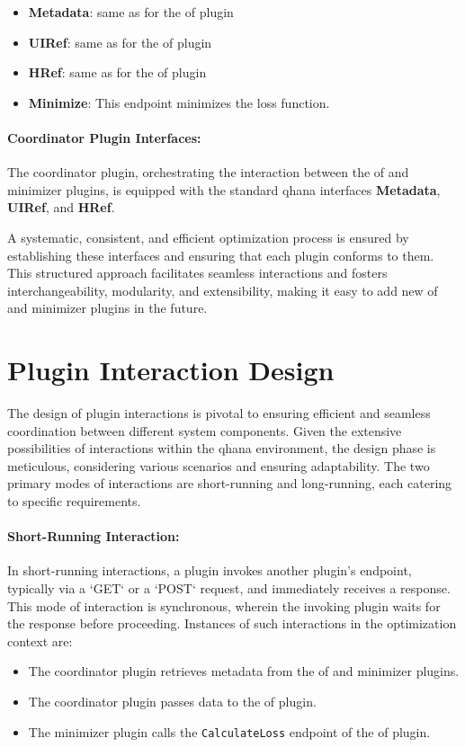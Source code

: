 \documentclass[
  a4paper,  %
  twoside,  %
  bibliography=totoc,
  headsepline,
  cleardoublepage=empty,
  parskip=half,
  draft=false
]{scrbook}
\begin{document}
\begin{itemize}
  \item \textbf{Metadata}: same as for the \gls{of} plugin
  \item \textbf{UIRef}: same as for the \gls{of} plugin
  \item \textbf{HRef}: same as for the \gls{of} plugin
  \item \textbf{Minimize}: This endpoint minimizes the loss function.
\end{itemize}

\paragraph{Coordinator Plugin Interfaces:}

The coordinator plugin, orchestrating the interaction between the \gls{of} and minimizer plugins, is equipped with the standard \gls{qhana} interfaces \textbf{Metadata}, \textbf{UIRef}, and \textbf{HRef}.

A systematic, consistent, and efficient optimization process is ensured by establishing these interfaces and ensuring that each plugin conforms to them.
This structured approach facilitates seamless interactions and fosters interchangeability, modularity, and extensibility, making it easy to add new \gls{of} and minimizer plugins in the future.

\section{Plugin Interaction Design}

The design of plugin interactions is pivotal to ensuring efficient and seamless coordination between different system components.
Given the extensive possibilities of interactions within the \gls{qhana} environment, the design phase is meticulous, considering various scenarios and ensuring adaptability.
The two primary modes of interactions are short-running and long-running, each catering to specific requirements.

\paragraph{Short-Running Interaction:}

In short-running interactions, a plugin invokes another plugin's endpoint, typically via a `GET` or a `POST` request, and immediately receives a response.
This mode of interaction is synchronous, wherein the invoking plugin waits for the response before proceeding.
Instances of such interactions in the optimization context are:
\begin{itemize}
    \item The coordinator plugin retrieves metadata from the \gls{of} and minimizer plugins.
    \item The coordinator plugin passes data to the \gls{of} plugin.
    \item The minimizer plugin calls the \texttt{CalculateLoss} endpoint of the \gls{of} plugin.
\end{itemize}
\end{document}
